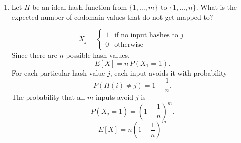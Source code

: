 \documentclass{article}
\begin{document}
\begin{enumerate}
\begin{enumerate}
        \item Let $H$ be an ideal hash function from $\{1, \ldots, m\}$ to $\{1, \ldots, n\}$. What is the expected number of codomain values that do not get mapped to?

        \[
        X_j =
        \begin{cases}
        1 & \text{if no input hashes to } j \\
        0 & \text{otherwise}
        \end{cases}
        \]
        Since there are $n$ possible hash values,
        \[
        E[X] = n\,P(X_1 = 1).
        \]
        For each particular hash value $j$, each input avoids it with probability
        \[
        P(H(i) \ne j) = 1 - \frac{1}{n}.
        \]
        The probability that all $m$ inputs avoid $j$ is
        \[
        P(X_j = 1) = \left(1 - \frac{1}{n}\right)^m.
        \]
        \[
        \boxed{E[X] = n\left(1 - \frac{1}{n}\right)^m}
        \]
    \end{enumerate}

\end{enumerate}
\end{document}
